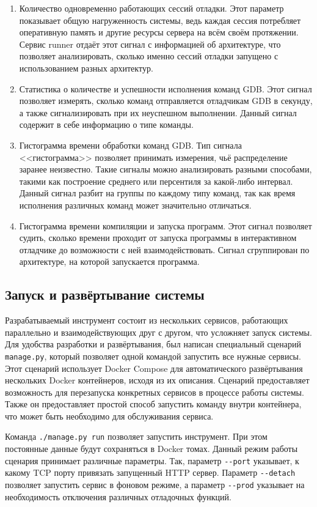 \documentclass[a4paper,article,14pt]{extarticle}
\begin{document}
\begin{enumerate}
    \item Количество одновременно работающих сессий отладки. Этот параметр показывает общую нагруженность системы, ведь каждая сессия потребляет оперативную память и другие ресурсы сервера на всём своём протяжении. Сервис runner отдаёт этот сигнал с информацией об архитектуре, что позволяет анализировать, сколько именно сессий отладки запущено с использованием разных архитектур.
    \item Статистика о количестве и успешности исполнения команд GDB. Этот сигнал позволяет измерять, сколько команд отправляется отладчикам GDB в секунду, а также сигнализировать при их неуспешном выполнении. Данный сигнал содержит в себе информацию о типе команды.
    \item Гистограмма времени обработки команд GDB. Тип сигнала <<гистограмма>> позволяет принимать измерения, чьё распределение заранее неизвестно. Такие сигналы можно анализировать разными способами, такими как построение среднего или персентиля за какой-либо интервал. Данный сигнал разбит на группы по каждому типу команд, так как время исполнения различных команд может значительно отличаться.
    \item Гистограмма времени компиляции и запуска программ. Этот сигнал позволяет судить, сколько времени проходит от запуска программы в интерактивном отладчике до возможности с ней взаимодействовать. Сигнал сгруппирован по архитектуре, на которой запускается программа.
\end{enumerate}

\subsection{Запуск и развёртывание системы}

Разрабатываемый инструмент состоит из нескольких сервисов, работающих параллельно и взаимодействующих друг с другом, что усложняет запуск системы. Для удобства разработки и развёртывания, был написан специальный сценарий \texttt{manage.py}, который позволяет одной командой запустить все нужные сервисы. Этот сценарий использует Docker Compose\cite{dockercompose} для автоматического развёртывания нескольких Docker контейнеров, исходя из их описания. Сценарий предоставляет возможность для перезапуска конкретных сервисов в процессе работы системы. Также он предоставляет простой способ запустить команду внутри контейнера, что может быть необходимо для обслуживания сервиса.

Команда \texttt{./manage.py run} позволяет запустить инструмент. При этом постоянные данные будут сохраняться в Docker томах. Данный режим работы сценария принимает различные параметры. Так, параметр \texttt{-{}-port} указывает, к какому TCP порту привязать запущенный HTTP сервер. Параметр \texttt{-{}-detach} позволяет запустить сервис в фоновом режиме, а параметр \texttt{-{}-prod} указывает на необходимость отключения различных отладочных функций.
\end{document}
